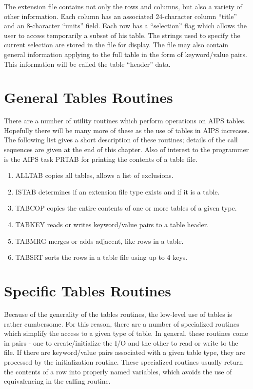 The extension file contains not only the rows and columns, but also a
variety of other information.  Each column has an associated
24-character column ``title'' and an 8-character ``units'' field.  Each
row has a ``selection'' flag which allows the user to access temporarily
a subset of his table.  The strings used to specify the current
selection are stored in the file for display.  The file may also
contain general information applying to the full table in the form of
keyword/value pairs.
This information will be called the table ``header'' data.

\section{General Tables Routines }
There are a number of utility routines which perform operations on
AIPS tables.  Hopefully there will be many more of these as the use of
tables in AIPS increases.  The following list gives a short
description of these routines; details of the call sequences are given
at the end of this chapter.  Also of interest to the programmer is the
AIPS task PRTAB for printing the contents of a table file.
\begin{enumerate} %
\item ALLTAB copies all tables, allows a list of exclusions.
\item ISTAB determines if an extension file type exists and if it is a
table.
\item TABCOP copies the entire contents of one or more tables of a given
type.
\item TABKEY reads or writes keyword/value pairs to a table header.
\item TABMRG merges or adds adjacent, like rows in a table.
\item TABSRT sorts the rows in a table file using up to 4 keys.

\end{enumerate} %

\section{Specific Tables Routines }
Because of the generality of the tables routines, the low-level use of
tables is rather cumbersome.  For this reason, there are a number of
specialized routines which simplify the access to a given type of
table.  In general, these routines come in pairs - one to
create/initialize the I/O and the other to read or write to the file.
If there are keyword/value pairs associated with a given table type,
they are processed by the initialization routine.  These specialized
routines usually return the contents of a row into properly named
variables, which avoids the use of equivalencing in the calling
routine.


